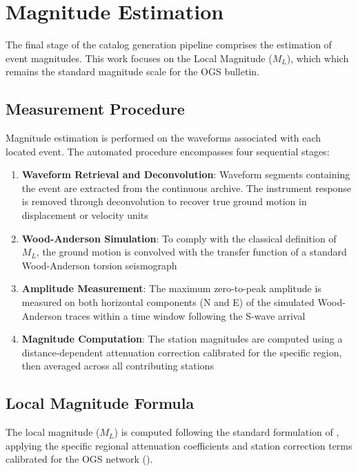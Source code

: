 \section{Magnitude Estimation}

The final stage of the catalog generation pipeline comprises the estimation of
event magnitudes. This work focuses on the Local Magnitude ($M_L$), which
which remains the standard magnitude scale for the OGS bulletin.

\subsection{Measurement Procedure}
Magnitude estimation is performed on the waveforms associated with each located
event. The automated procedure encompasses four sequential stages:
\begin{enumerate}
  \item \textbf{Waveform Retrieval and Deconvolution}: Waveform segments
    containing the event are extracted from the continuous archive. The
    instrument response is removed through deconvolution to recover true ground
    motion in displacement or velocity units

  \item \textbf{Wood-Anderson Simulation}: To comply with the classical
    definition of $M_L$, the ground motion is convolved with the transfer
    function of a standard Wood-Anderson torsion seismograph

  \item \textbf{Amplitude Measurement}: The maximum zero-to-peak amplitude
    is measured on both horizontal components (N and E) of the simulated
    Wood-Anderson traces within a time window following the S-wave arrival

  \item \textbf{Magnitude Computation}: The station magnitudes are computed
    using a distance-dependent attenuation correction calibrated for
    the specific
    region, then averaged across all contributing stations
\end{enumerate}

\subsection{Local Magnitude Formula}
The local magnitude ($M_L$) is computed following the standard formulation of
\cite{HuttonBoore1987}, applying the specific regional attenuation coefficients
and station correction terms calibrated for the OGS network (\cite{SMINO}).
